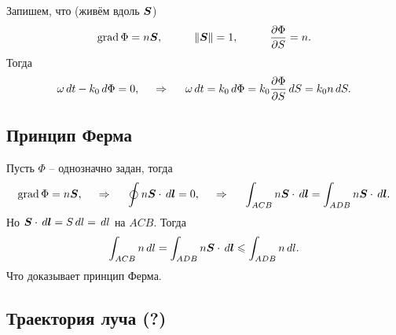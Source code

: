 Запишем, что (живём вдоль $\mbox{\boldmath $S$}$)
\begin{equation*}
    \mathop{\mathrm{grad}}\nolimits \Phi = n \mbox{\boldmath $S$},
    \hspace{1 cm}
    \|\mbox{\boldmath $S$}\| = 1,
    \hspace{1 cm}
    \frac{\partial \Phi}{\partial S} = n.
\end{equation*}
Тогда
\begin{equation*}
    \omega \, d t - k_0 \, d \Phi = 0,
    \hspace{0.5cm} \Rightarrow \hspace{0.5cm}
    \omega \, d t = k_0 \, d \Phi = k_0 \frac{\partial \Phi}{\partial S} \, d S = k_0 n \, d S.
\end{equation*}




\subsection{Принцип Ферма}

Пусть $\Phi$ -- однозначно задан, тогда 
\begin{equation*}
    \mathop{\mathrm{grad}}\nolimits \Phi = n \mbox{\boldmath $S$},
    \hspace{0.5cm} \Rightarrow \hspace{0.5cm}
    \oint n \mbox{\boldmath $S$} \cdot \, d \mbox{\boldmath $l$} = 0,
    \hspace{0.5cm} \Rightarrow \hspace{0.5cm}
    \int_{ACB} n \mbox{\boldmath $S$} \cdot \, d \mbox{\boldmath $l$} = 
    \int_{ADB} n \mbox{\boldmath $S$} \cdot \, d \mbox{\boldmath $l$}.
\end{equation*}
Но $\mbox{\boldmath $S$} \cdot \, d \mbox{\boldmath $l$} = S \, d l = \, d l$ на $ACB$. Тогда
\begin{equation*}
    \int_{ACB} n \, d l = \int_{ADB} n \mbox{\boldmath $S$} \cdot \, d \mbox{\boldmath $l$} \leqslant \int_{ADB} n \, d l.
\end{equation*}
Что доказывает принцип Ферма.


\subsection{Траектория луча (?)}

